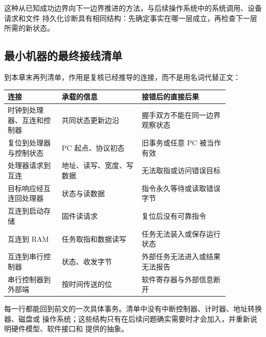 这种从已知成功边界向下一边界推进的方法，与后续操作系统中的系统调用、设备请求和文件
持久化诊断具有相同结构：先确定事实在哪一层成立，再检查下一层所需的新状态。

\subsection{最小机器的最终接线清单}

到本章末再列清单，作用是复核已经推导的连接，而不是用名词代替正文：

\begin{longtable}{|L{0.21\linewidth}|L{0.31\linewidth}|L{0.34\linewidth}|}
\hline
连接 & 承载的信息 & 接错后的直接后果 \\ \hline
时钟到处理器、互连和控制器 & 共同状态更新边沿 & 握手双方不能在同一边界观察状态 \\ \hline
复位到处理器与控制状态 & PC 起点、协议初态 & 旧事务或任意 PC 被当作有效 \\ \hline
处理器请求到互连 & 地址、读写、宽度、写数据 & 无法取指或访问错误目标 \\ \hline
目标响应经互连回处理器 & 状态与读数据 & 指令永久等待或读取错误字节 \\ \hline
互连到启动存储 & 固件读请求 & 复位后没有可靠指令 \\ \hline
互连到 RAM & 任务取指和数据读写 & 任务无法装入或保存运行状态 \\ \hline
互连到串行控制器 & 状态、收发字节 & 外部任务无法进入或结果无法报告 \\ \hline
串行控制器到外部端 & 按时间传送的位 & 软件寄存器与外部信息断开 \\ \hline
\end{longtable}

每一行都能回到前文的一次具体事务。清单中没有中断控制器、计时器、地址转换器、磁盘或
操作系统；这些结构只有在后续问题确实需要时才会加入，并重新说明硬件模型、软件接口和
提供的抽象。
